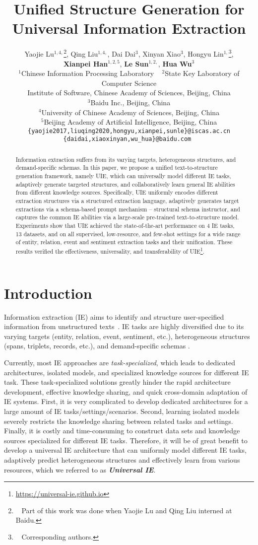 \documentclass[11pt]{article}
\title{Unified Structure Generation for Universal Information Extraction}
\author{
  Yaojie Lu${}^{1,4,}$\thanks{~ Part of this work was done when Yaojie Lu and Qing Liu interned at Baidu.},
  Qing Liu${}^{1,4,}$\footnotemark[1],
  Dai Dai${}^{3}$,
  Xinyan Xiao${}^{3}$,
  Hongyu Lin${}^{1,}$\thanks{~ Corresponding authors.},
  \\
  \textbf{Xianpei Han}${}^{1,2,5}$,
  \textbf{Le Sun}${}^{1,2,}$\footnotemark[2],
  \textbf{Hua Wu}${}^{3}$
  \\
  ${}^{1}$Chinese Information Processing Laboratory ~
  ${}^{2}$State Key Laboratory of Computer Science \\
  Institute of Software, Chinese Academy of Sciences, Beijing, China\\
  ${}^{3}$Baidu Inc., Beijing, China \\
  ${}^{4}$University of Chinese Academy of Sciences, Beijing, China \\
  ${}^{5}$Beijing Academy of Artificial Intelligence, Beijing, China \\
 {\tt \{yaojie2017,liuqing2020,hongyu,xianpei,sunle\}@iscas.ac.cn} \\
 {\tt \{daidai,xiaoxinyan,wu\_hua\}@baidu.com }
}
\begin{document}
\maketitle
\begin{abstract}
Information extraction suffers from its varying targets, heterogeneous structures, and demand-specific schemas.
In this paper, we propose a unified text-to-structure generation framework, namely UIE, which can universally model different IE tasks, adaptively generate targeted structures, and collaboratively learn general IE abilities from different knowledge sources. 
Specifically, UIE uniformly encodes different extraction structures via a structured extraction language, adaptively generates target extractions via a schema-based prompt mechanism – structural schema instructor, and captures the common IE abilities via a large-scale pre-trained text-to-structure model. 
Experiments show that UIE achieved the state-of-the-art performance on 4 IE tasks, 13 datasets, and on all supervised, low-resource, and few-shot settings for a wide range of entity, relation, event and sentiment extraction tasks and their unification.
These results verified the effectiveness, universality, and transferability of UIE\footnote{\url{https://universal-ie.github.io}}. \end{abstract}

\section{Introduction} \label{sec:introduction}

Information extraction (IE) aims to identify and structure user-specified information from unstructured texts~\citep{andersen-etal-1992-automatic,grishman_2019}.
IE tasks are highly diversified due to its varying targets (entity, relation, event, sentiment, etc.), heterogeneous structures (spans, triplets, records, etc.), and demand-specific schemas \citep{grishman-sundheim-1996-message,ace2004-annotation,ji-grishman-2011-knowledge}.

Currently, most IE approaches are \textit{task-specialized}, which leads to dedicated architectures, isolated models, and specialized knowledge sources for different IE task.
These task-specialized solutions greatly hinder the rapid architecture development, effective knowledge sharing, and quick cross-domain  adaptation of IE systems.
First, it is very complicated to develop dedicated architectures for a large amount of IE tasks/settings/scenarios.
Second, learning isolated models severely restricts the knowledge sharing between related tasks and settings. 
Finally, it is costly and time-consuming to construct data sets and knowledge sources specialized for different IE tasks.
Therefore, it will be of great benefit to develop a universal IE architecture that can uniformly model different IE tasks, adaptively predict heterogeneous structures and effectively learn from various resources, which we referred to as \textit{\textbf{Universal IE}}.
\end{document}
